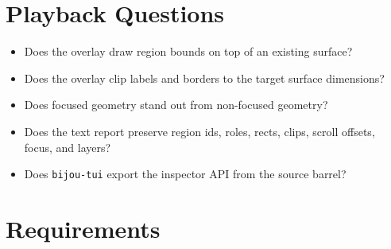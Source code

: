 \section{Playback Questions}\label{record-122-playback-questions}

\begin{itemize}
\tightlist
\item
  Does the overlay draw region bounds on top of an existing surface?
\item
  Does the overlay clip labels and borders to the target surface dimensions?
\item
  Does focused geometry stand out from non-focused geometry?
\item
  Does the text report preserve region ids, roles, rects, clips, scroll offsets, focus, and layers?
\item
  Does \texttt{b\allowbreak{}i\allowbreak{}j\allowbreak{}o\allowbreak{}u\allowbreak{}-\allowbreak{}t\allowbreak{}u\allowbreak{}i} export the inspector API from the source barrel?
\end{itemize}

\section{Requirements}\label{record-122-requirements}

